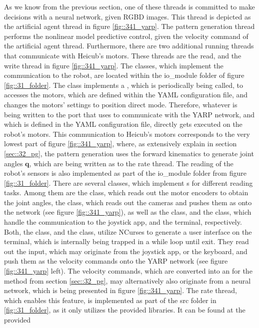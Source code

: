 As we know from the previous section, one of these threads is committed to make decisions with a neural network, given RGBD images. This thread is depicted as the artificial agent thread in figure \ref{fig::341_yarp}. The pattern generation thread performs the nonlinear model predictive control, given the velocity command of the artificial agent thread. Furthermore, there are two additional running threads that communicate with Heicub's motors. These threads are the read, and the write thread in figure \ref{fig::341_yarp}. The classes, which implement the communication to the robot, are located within the io\_module folder of figure \ref{fig::31_folder}. The  class implements a , which is periodically being called, to accesses the motors, which are defined within the YAML configuration file, and changes the motors' settings to position direct mode. Therefore, whatever is being written to the port that  uses to communicate with the YARP network, and which is defined in the YAML configuration file, directly gets executed on the robot's motors. This communication to Heicub's motors corresponds to the very lowest part of figure \ref{fig::341_yarp}, where, as extensively explain in section \ref{sec::32_pg}, the pattern generation uses the forward kinematics to generate joint angles $\bm{q}$, which are being written as  to the  rate thread. The reading of the robot's sensors is also implemented as part of the io\_module folder from figure \ref{fig::31_folder}. There are several classes, which implement s for different reading tasks. Among them are the  class, which reads out the motor encoders to obtain the joint angles, the  class, which reads out the cameras and pushes them as  onto the network (see figure \ref{fig::341_yarp}), as well as the  class, and the  class, which handle the communication to the joystick app, and the terminal, respectively. Both, the  class, and the  class, utilize NCurses to generate a user interface on the terminal, which is internally being trapped in a while loop until exit. They read out the input, which may originate from the joystick app, or the keyboard, and push them as the velocity commands onto the YARP network (see figure \ref{fig::341_yarp} left). The velocity commands, which are converted into an  for the  method from section \ref{sec::32_pg}, may alternatively also originate from a neural network, which is being presented in figure \ref{fig::341_yarp}. The  rate thread, which enables this feature, is implemented as part of the src folder in \ref{fig::31_folder}, as it only utilizes the provided libraries. It can be found at the provided 